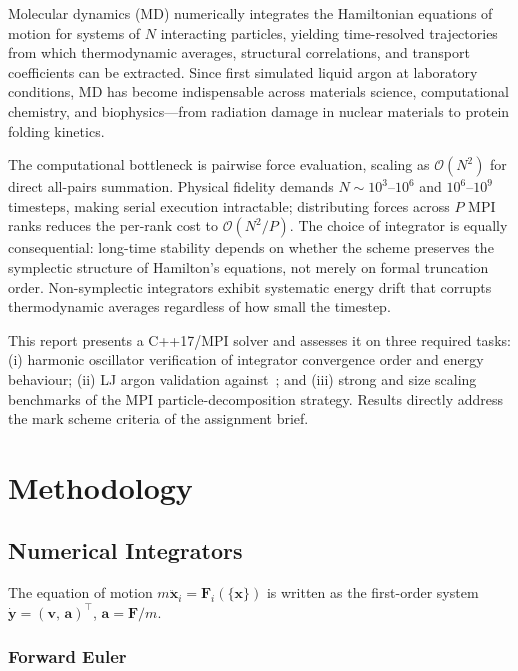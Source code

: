 \documentclass[10pt,twocolumn]{article}
\begin{document}
Molecular dynamics (MD) numerically integrates the Hamiltonian equations of
motion for systems of $N$ interacting particles, yielding time-resolved
trajectories from which thermodynamic averages, structural correlations, and
transport coefficients can be extracted. Since \citet{Rahman1964} first simulated
liquid argon at laboratory conditions, MD has become indispensable across
materials science, computational chemistry, and biophysics---from radiation
damage in nuclear materials to protein folding kinetics.

The computational bottleneck is pairwise force evaluation, scaling as
$\mathcal{O}(N^2)$ for direct all-pairs summation. Physical fidelity demands
$N\sim10^3$--$10^6$ and $10^6$--$10^9$ timesteps, making serial execution
intractable; distributing forces across $P$ MPI ranks reduces the per-rank
cost to $\mathcal{O}(N^2/P)$. The choice of integrator is equally
consequential: long-time stability depends on whether the scheme preserves
the symplectic structure of Hamilton's equations, not merely on formal
truncation order. Non-symplectic integrators exhibit systematic energy drift
that corrupts thermodynamic averages regardless of how small the timestep.

This report presents a C++17/MPI solver and assesses it on three required
tasks: (i) harmonic oscillator verification of integrator convergence order
and energy behaviour; (ii) LJ argon validation against~\citet{Rahman1964};
and (iii) strong and size scaling benchmarks of the MPI particle-decomposition
strategy. Results directly address the mark scheme criteria of the assignment
brief.

\section{Methodology}
\label{sec:methodology}

\subsection{Numerical Integrators}
\label{sec:integrators}

The equation of motion $m\ddot{\mathbf{x}}_i = \mathbf{F}_i(\{\mathbf{x}\})$
is written as the first-order system
$\dot{\mathbf{y}} = (\mathbf{v},\,\mathbf{a})^\top$,
$\mathbf{a} = \mathbf{F}/m$.

\subsubsection{Forward Euler}
\end{document}
